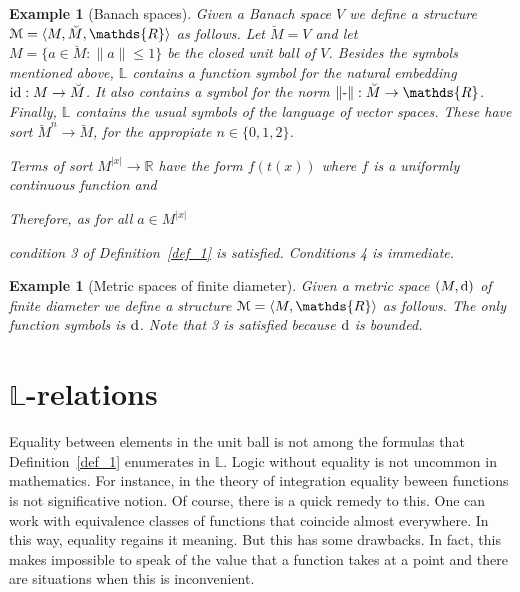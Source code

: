 \documentclass[12pt,letterpaper,oneside,reqno]{amsart}
\theoremstyle{plain}
\newtheorem{example}[theorem]{Example}
\theoremstyle{remark}
\begin{document}
\begin{example}[Banach spaces]\label{ex_banach}
  Given a Banach space  $V$ we define a structure ${\EuScript M}=\langle  M,\breve M,\mathds{R}\rangle$ as follows.
  Let $\breve M=V$ and let $M=\{a\in \breve M: \|a\|\le1\}$ be the closed unit ball of $V$.
  Besides the symbols mentioned above, $\mathds{L}$ contains a function symbol for the natural embedding ${\rm id}: M\to \breve M$.
  It also contains a symbol for the norm $\|\mbox-\|:\breve M\to\mathds{R}$.
  Finally, $\mathds{L}$ contains the usual symbols of the language of vector spaces.
  These have sort ${\breve M}^n\to \breve M$, for the appropiate $n\in\{0,1,2\}$.

  Terms of sort $M^{|x|}\to\mathds{R}$ have the form $f(t(x))$ where $f$ is a uniformly continuous function and


  Therefore, as for all $a\in M^{|x|}$


  condition 3 of Definition~\ref{def_1} is  satisfied.
  Conditions 4 is immediate.
\end{example}


\begin{example}[Metric spaces of finite diameter]\label{ex_metric}
  Given a metric space $(M,{\rm d})$ of finite diameter we define a structure ${\EuScript M}=\langle  M,\mathds{R}\rangle$ as follows.
  The only function symbols is ${\rm d}$.
  Note that 3 is satisfied because ${\rm d}$ is bounded.
\end{example}

\section{$\mathds{L}$-relations}\label{L-relations}

Equality between elements in the unit ball is not among the formulas that Definition~\ref{def_1} enumerates in $\mathds{L}$.
Logic without equality is not uncommon in mathematics.
For instance, in the theory of integration equality beween functions is not significative notion.
Of course, there is a quick remedy to this.
One can work with equivalence classes of functions that coincide almost everywhere.
In this way, equality regains it meaning.
But this has some drawbacks.
In fact, this makes impossible to speak of the value that a function takes at a point and there are situations when this is inconvenient.
\end{document}
